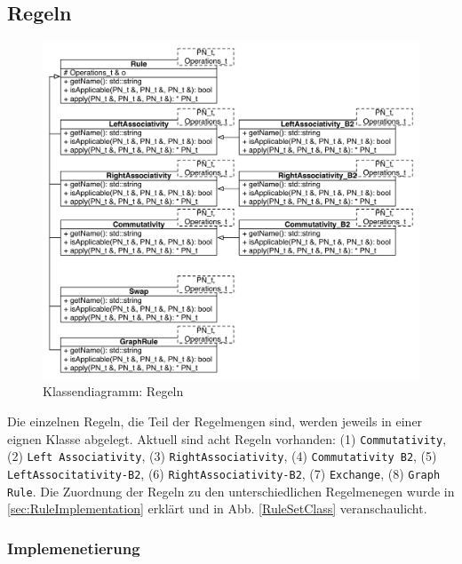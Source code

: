 \subsection{Regeln}

\begin{figure}[ht]
  \centering
  \includegraphics[height=\textwidth]{04_Implementierung/00_media/Rules.pdf}
  \caption{Klassendiagramm: Regeln}
  \label{RuleClassDiagram}
\end{figure}

Die einzelnen Regeln, die Teil der Regelmengen sind, werden jeweils in einer eignen Klasse abgelegt. Aktuell sind acht Regeln vorhanden: (1) \texttt{Commutativity}, (2) \texttt{Left Associativity}, (3) \texttt{Right\-Associativity}, (4) \texttt{Commu\-tativity B2}, (5) \texttt{Left\-Associtativity-B2}, (6) \texttt{Right\-Associativity-B2}, (7) \texttt{Exchange}, (8) \texttt{Graph Rule}. Die Zuordnung der Regeln zu den unterschiedlichen Regelmenegen wurde in \ref{sec:RuleImplementation} erklärt und in Abb. \ref{RuleSetClass} veranschaulicht.

\subsubsection{Implemenetierung}


